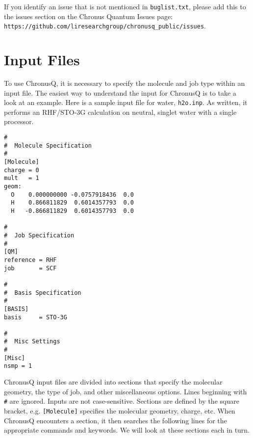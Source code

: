 \documentclass[12pt]{article}
\begin{document}
   If you identify an issue that is not mentioned in \texttt{buglist.txt}, please add this to the issues section
   on the Chronus Quantum Issues page:  \newline \texttt{https://github.com/liresearchgroup/chronusq\_public/issues}. 

  \section{Input Files} \label{sec:InputFiles}
  To use ChronusQ, it is necessary to specify the molecule and job type within an input file. The easiest way to understand the input for ChronusQ is to take a look at an example. Here is a sample input file for water, \texttt{h2o.inp}. As written, it performs an RHF/STO-3G calculation on neutral, singlet water with a single processor.
\begin{lstlisting}
#
#  Molecule Specification
#
[Molecule]
charge = 0
mult   = 1
geom:
  O    0.000000000 -0.0757918436  0.0
  H    0.866811829  0.6014357793  0.0
  H   -0.866811829  0.6014357793  0.0

#
#  Job Specification
#
[QM]
reference = RHF
job       = SCF 

#
#  Basis Specification
#
[BASIS]
basis     = STO-3G 

#
#  Misc Settings
#
[Misc]
nsmp = 1
\end{lstlisting}
ChronusQ input files are divided into sections that specify the molecular geometry, the type of job, and other miscellaneous options. Lines beginning with \texttt{\#} are ignored. Inputs are not case-sensitive. Sections are defined by the square bracket, e.g. \texttt{[Molecule]} specifies the molecular geometry, charge, etc. When ChronusQ encounters a section, it then searches the following lines for the appropriate commands and keywords. We will look at these sections each in turn. 
   
\end{document}
